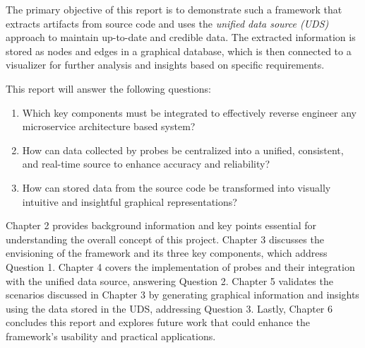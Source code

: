 The primary objective of this report is to demonstrate such a framework that extracts artifacts from source code and uses the \textit{unified data source (UDS)} approach to maintain up-to-date and credible data. The extracted information is stored as nodes and edges in a graphical database, which is then connected to a visualizer for further analysis and insights based on specific requirements.

This report will answer the following questions:
\begin{enumerate}
    \item Which key components must be integrated to effectively reverse engineer any microservice architecture based system?
    \item How can data collected by probes be centralized into a unified, consistent, and real-time source to enhance accuracy and reliability?
    \item How can stored data from the source code be transformed into visually intuitive and insightful graphical representations?
\end{enumerate}

Chapter 2 provides background information and key points essential for understanding the overall concept of this project. Chapter 3 discusses the envisioning of the framework and its three key components, which address Question 1. Chapter 4 covers the implementation of probes and their integration with the unified data source, answering Question 2. Chapter 5 validates the scenarios discussed in Chapter 3 by generating graphical information and insights using the data stored in the UDS, addressing Question 3. Lastly, Chapter 6 concludes this report and explores future work that could enhance the framework's usability and practical applications.
